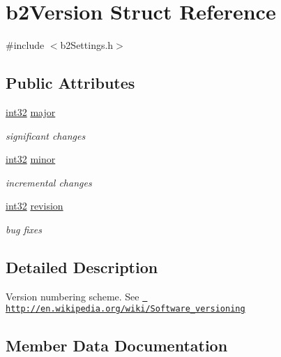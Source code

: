 \hypertarget{structb2_version}{}\section{b2\+Version Struct Reference}
\label{structb2_version}


{\ttfamily \#include $<$b2\+Settings.\+h$>$}

\subsection*{Public Attributes}
\begin{DoxyCompactItemize}
\item 
\mbox{\hyperlink{b2_settings_8h_a43d43196463bde49cb067f5c20ab8481}{int32}} \mbox{\hyperlink{structb2_version_a720da8e346364d1cb34d176125380b44}{major}}
\begin{DoxyCompactList}\small\item\em significant changes \end{DoxyCompactList}\item 
\mbox{\hyperlink{b2_settings_8h_a43d43196463bde49cb067f5c20ab8481}{int32}} \mbox{\hyperlink{structb2_version_a115b8797a6e0b8e53f54502bd20d89da}{minor}}
\begin{DoxyCompactList}\small\item\em incremental changes \end{DoxyCompactList}\item 
\mbox{\hyperlink{b2_settings_8h_a43d43196463bde49cb067f5c20ab8481}{int32}} \mbox{\hyperlink{structb2_version_a395cfe1434e348115d2ead3d72b88847}{revision}}
\begin{DoxyCompactList}\small\item\em bug fixes \end{DoxyCompactList}\end{DoxyCompactItemize}


\subsection{Detailed Description}
Version numbering scheme. See \href{http://en.wikipedia.org/wiki/Software_versioning}{\texttt{ http\+://en.\+wikipedia.\+org/wiki/\+Software\+\_\+versioning}} 

\subsection{Member Data Documentation}
\mbox{\label{structb2_version_a720da8e346364d1cb34d176125380b44}} 
